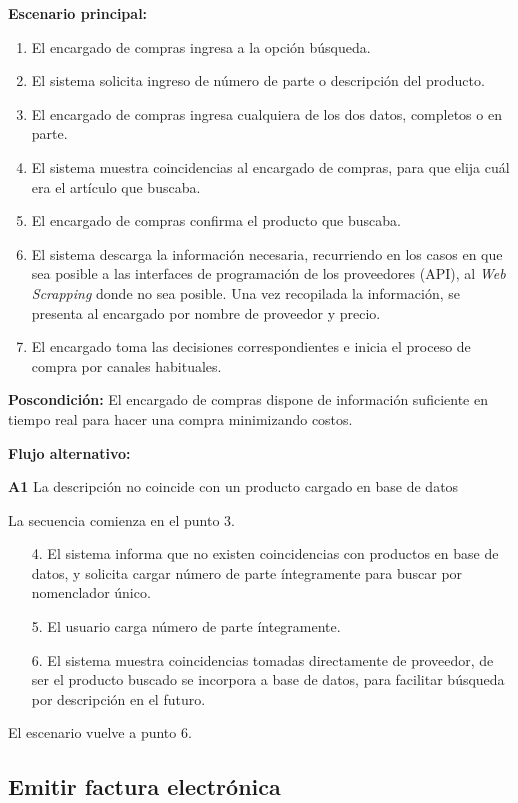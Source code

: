 \documentclass[11pt]{article}
\begin{document}
\textbf{Escenario principal:}
\begin{enumerate}
	\item El encargado de compras ingresa a la opción búsqueda.
	\item El sistema solicita ingreso de número de parte o descripción del producto.
	\item El encargado de compras ingresa cualquiera de los dos datos, completos o en parte.
	\item El sistema muestra coincidencias al encargado de compras, para que elija cuál era el artículo que buscaba.
	\item El encargado de compras confirma el producto que buscaba.
	\item El sistema descarga la información necesaria, 
	recurriendo en los casos en que sea posible a las interfaces de programación de los proveedores (API),
	al \textit{Web Scrapping} donde no sea posible. Una vez recopilada la información, 
	se presenta al encargado por nombre de proveedor y precio.
	\item El encargado toma las decisiones correspondientes e inicia el proceso de compra por canales habituales.
\end{enumerate}

\textbf{Poscondición:}
El encargado de compras dispone de información suficiente en tiempo real para hacer una compra minimizando costos.

\textbf{Flujo alternativo:}

\textbf{A1} La descripción no coincide con un producto cargado en base de datos 

La secuencia comienza en el punto 3.

\begin{enumerate}
	\item[4.] El sistema informa que no existen coincidencias con productos en base de datos,
	y solicita cargar número de parte íntegramente para buscar por nomenclador único.
	\item[5.] El usuario carga número de parte íntegramente.
	\item[6.] El sistema muestra coincidencias tomadas directamente de proveedor,
	de ser el producto buscado se incorpora a base de datos,
	para facilitar búsqueda por descripción en el futuro.
\end{enumerate}

El escenario vuelve a punto 6.

\subsection{Emitir factura electrónica}
\end{document}
